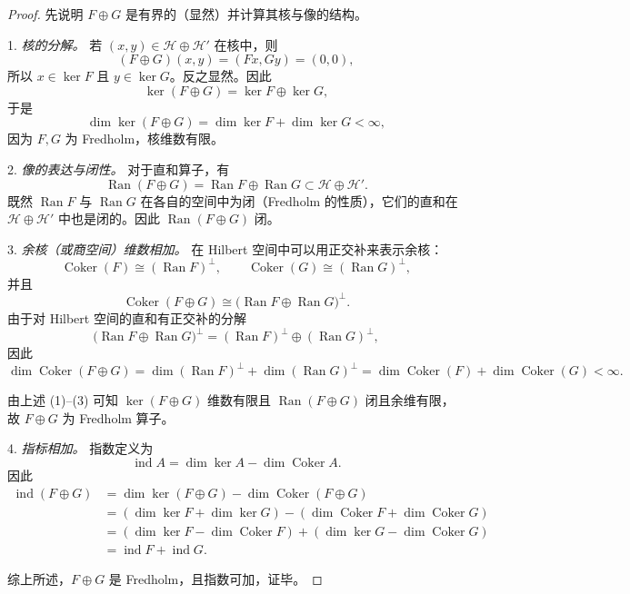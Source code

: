 \documentclass[lang=cn,newtx,10pt,scheme=chinese,thmcnt=chapter]{elegantbook}
\begin{document}
\begin{problemset}
\begin{proof}
先说明 $F\oplus G$ 是有界的（显然）并计算其核与像的结构。

1. \emph{核的分解。} 若 $(x,y)\in\mathcal H\oplus\mathcal H'$ 在核中，则
\[
(F\oplus G)(x,y)=(Fx,Gy)=(0,0),
\]
所以 $x\in\ker F$ 且 $y\in\ker G$。反之显然。因此
\[
\ker(F\oplus G)=\ker F\oplus\ker G,
\]
于是
\[
\dim\ker(F\oplus G)=\dim\ker F+\dim\ker G<\infty,
\]
因为 $F,G$ 为 Fredholm，核维数有限。

2. \emph{像的表达与闭性。} 对于直和算子，有
\[
\operatorname{Ran}(F\oplus G)=\operatorname{Ran}F\oplus\operatorname{Ran}G
\subset \mathcal H\oplus\mathcal H'.
\]
既然 $\operatorname{Ran}F$ 与 $\operatorname{Ran}G$ 在各自的空间中为闭（Fredholm 的性质），它们的直和在 $\mathcal H\oplus\mathcal H'$ 中也是闭的。因此 $\operatorname{Ran}(F\oplus G)$ 闭。  

3. \emph{余核（或商空间）维数相加。} 在 Hilbert 空间中可以用正交补来表示余核：
\[
\operatorname{Coker}(F)\cong (\operatorname{Ran}F)^\perp,\qquad
\operatorname{Coker}(G)\cong (\operatorname{Ran}G)^\perp,
\]
并且
\[
\operatorname{Coker}(F\oplus G)\cong \big(\operatorname{Ran}F\oplus\operatorname{Ran}G\big)^\perp.
\]
由于对 Hilbert 空间的直和有正交补的分解
\[
\big(\operatorname{Ran}F\oplus\operatorname{Ran}G\big)^\perp
=(\operatorname{Ran}F)^\perp\oplus(\operatorname{Ran}G)^\perp,
\]
因此
\[
\dim\operatorname{Coker}(F\oplus G)
=\dim(\operatorname{Ran}F)^\perp+\dim(\operatorname{Ran}G)^\perp
=\dim\operatorname{Coker}(F)+\dim\operatorname{Coker}(G)<\infty.
\]

由上述 (1)--(3) 可知 $\ker(F\oplus G)$ 维数有限且 $\operatorname{Ran}(F\oplus G)$ 闭且余维有限，故 $F\oplus G$ 为 Fredholm 算子。

4. \emph{指标相加。} 指数定义为
\[
\operatorname{ind}A=\dim\ker A-\dim\operatorname{Coker}A.
\]
因此
\[
\begin{aligned}
\operatorname{ind}(F\oplus G)
&=\dim\ker(F\oplus G)-\dim\operatorname{Coker}(F\oplus G)\\
&=(\dim\ker F+\dim\ker G)
-(\dim\operatorname{Coker}F+\dim\operatorname{Coker}G)\\
&=(\dim\ker F-\dim\operatorname{Coker}F)+(\dim\ker G-\dim\operatorname{Coker}G)\\
&=\operatorname{ind}F+\operatorname{ind}G.
\end{aligned}
\]

综上所述，$F\oplus G$ 是 Fredholm，且指数可加，证毕。
\end{proof}
\end{problemset}
\end{document}
